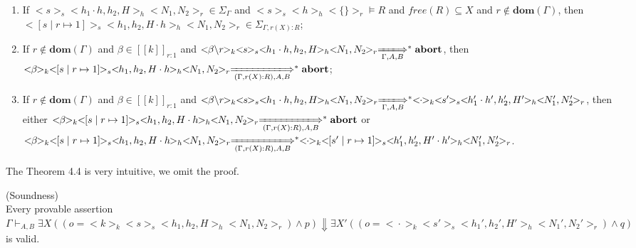 \documentclass{lmcs} %
\theoremstyle{plain}\newtheorem{satz}[thm]{Satz} %
\begin{document}
\begin{thm}
\begin{enumerate}
  \item If $<\!\!s\!\!>_s<\!\!h_1\cdot h,h_2,H\!\!>_h<\!\!N_1,N_2\!\!>_r\in \Sigma_\Gamma$ and $<\!\!s\!\!>_s<\!\!h\!\!>_h<\!\!\{\}\!\!>_r\models R$ and $free(R)\subseteq X$ and $r\notin \mathbf{dom}(\Gamma)$, then $<\!\![s\mid r\mapsto 1]\!\!>_s<\!\!h_1,h_2,H\cdot h\!\!>_h<\!\!N_1,N_2\!\!>_r\in \Sigma_{\Gamma,r(X):R}$;
  \item If $r\notin \mathbf{dom}(\Gamma)$ and $\beta\in [\![k]\!]_{r:1}$ and $<\!\!\beta\backslash r\!\!>_k<\!\!s\!\!>_s<\!\!h_1\cdot h,h_2,H\!\!>_h<\!\!N_1,N_2\!\!>_r\xLongrightarrow[\Gamma, A, B]{}^*\mathbf{abort}$, then $<\!\!\beta\!\!>_k<\!\![s\mid r\mapsto 1]\!\!>_s<\!\!h_1,h_2,H\cdot h\!\!>_h<\!\!N_1,N_2\!\!>_r\xLongrightarrow[(\Gamma,r(X):R), A, B]{}^*\mathbf{abort}$;
  \item If $r\notin \mathbf{dom}(\Gamma)$ and $\beta\in [\![k]\!]_{r:1}$ and $<\!\!\beta\backslash r\!\!>_k<\!\!s\!\!>_s<\!\!h_1\cdot h,h_2,H\!\!>_h<\!\!N_1,N_2\!\!>_r\xLongrightarrow[\Gamma, A, B]{}^*<\!\!\cdot\!\!>_k<\!\!s'\!\!>_s<\!\!h_1'\cdot h',h_2',H'\!\!>_h<\!\!N_1',N_2'\!\!>_r$, then either  $<\!\!\beta\!\!>_k<\!\![s\mid r\mapsto 1]\!\!>_s<\!\!h_1,h_2,H\cdot h\!\!>_h<\!\!N_1,N_2\!\!>_r\xLongrightarrow[(\Gamma,r(X):R), A, B]{}^*\mathbf{abort}$ or $<\!\!\beta\!\!>_k<\!\![s\mid r\mapsto 1]\!\!>_s<\!\!h_1,h_2,H\cdot h\!\!>_h<\!\!N_1,N_2\!\!>_r\xLongrightarrow[(\Gamma,r(X):R), A, B]{}^*<\!\!\cdot\!\!>_k<\!\![s'\mid r\mapsto 1]\!\!>_s<\!\!h_1',h_2',H'\cdot h'\!\!>_h<\!\!N_1',N_2'\!\!>_r$.
\end{enumerate}
\end{thm}
The Theorem 4.4 is very intuitive, we omit the proof.
\begin{thm}(Soundness)\\
Every provable assertion $\Gamma \vdash_{A,B} \exists X((o=<\!\!k\!\!>_k<\!\!s\!\!>_s<\!\!h_1,h_2,H\!\!>_h<\!\!N_1,N_2\!\!>_r)\land p)\Downarrow \exists X'((o=<\!\!\cdot\!\!>_k<\!\!s'\!\!>_s<\!\!h_1',h_2',H'\!\!>_h<\!\!N_1',N_2'\!\!>_r)\land q)$ is valid.
\end{thm}
\end{document}
